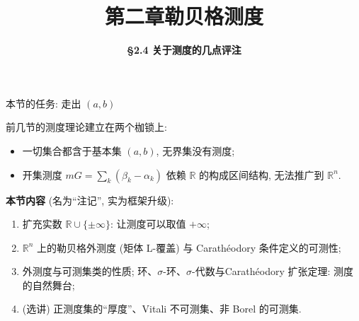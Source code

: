 \everymath{\displaystyle}



\title[第二章\\
勒贝格测度]{\texorpdfstring{\LARGE \bfseries 第二章\quad 勒贝格测度}{第二章 勒贝格测度}}
\author[\S 2.4\\
测度的几点评注]
{\Large \bfseries \S 2.4 关于测度的几点评注}
\date{}





\begin{frame}

\titlepage

\end{frame}




\begin{frame}{本节的任务: 走出 $(a,b)$}

前几节的测度理论建立在\alert{两个枷锁}上:
\begin{itemize}
\item 一切集合都含于基本集 $(a, b)$, \alert{无界集}没有测度;
\item 开集测度 $mG = \sum_k (\beta_k - \alpha_k)$ 依赖 $\mathbb{R}$ 的\alert{构成区间结构}, 无法推广到 $\mathbb{R}^n$.
\end{itemize}

\pause

\textbf{本节内容} (名为``注记'', 实为框架升级):
\begin{enumerate}
\item \alert{扩充实数} $\mathbb{R} \cup \{\pm\infty\}$: 让测度可以取值 $+\infty$;
\item $\mathbb{R}^n$ 上的\alert{勒贝格外测度} (矩体 L-覆盖) 与 \alert{Carath\'{e}odory 条件}定义的可测性;
\item 外测度与可测集类的性质; \alert{环、$\sigma$-环、$\sigma$-代数}与\alert{Carath\'{e}odory 扩张定理}: 测度的自然舞台;
\item (选讲) 正测度集的``厚度''、\alert{Vitali 不可测集}、\alert{非 Borel 的可测集}.
\end{enumerate}

\end{frame}

